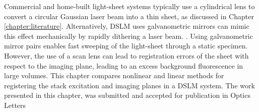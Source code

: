 Commercial and home-built\cite{pitrone_openspim:_2013} light-sheet systems typically use a cylindrical lens to convert a circular Gaussian laser beam into a thin sheet, as discussed in Chapter \ref{chapter:literature}.
Alternatively, \gls{DSLM} uses galvanometric mirrors can mimic this effect mechanically by rapidly dithering a laser beam. %
\cite{keller_fast_2010-1}.
Using galvanometric mirror pairs enables fast sweeping of the \gls{light-sheet} through a static specimen.
However, the use of a scan lens can lead to registration errors of the sheet with respect to the imaging plane, leading to an excess background fluorescence in large volumes.
This chapter compares nonlinear and linear methods for registering the stack excitation and imaging planes in a \gls{DSLM} system.
The work presented in this chapter, was submitted and accepted for publication in Optics Letters~\cite{russellHomographicallyGeneratedLight2018}
\pagebreak

